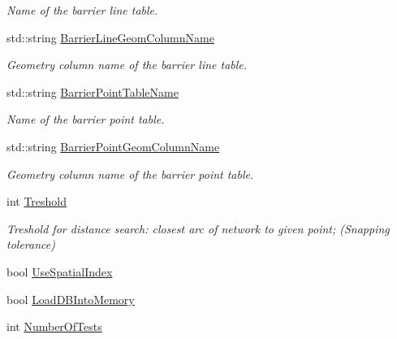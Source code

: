 \begin{DoxyCompactItemize}
\begin{DoxyCompactList}\small\item\em Name of the barrier line table. \end{DoxyCompactList}\item 
std\+::string \hyperlink{structnetxpert_1_1cnfg_1_1Config_a53c92c5975dbb9b861f87838021c360e}{Barrier\+Line\+Geom\+Column\+Name}\hypertarget{structnetxpert_1_1cnfg_1_1Config_a53c92c5975dbb9b861f87838021c360e}{}\label{structnetxpert_1_1cnfg_1_1Config_a53c92c5975dbb9b861f87838021c360e}

\begin{DoxyCompactList}\small\item\em Geometry column name of the barrier line table. \end{DoxyCompactList}\item 
std\+::string \hyperlink{structnetxpert_1_1cnfg_1_1Config_a344e11f497239a95bb1cf7f94542dcbc}{Barrier\+Point\+Table\+Name}\hypertarget{structnetxpert_1_1cnfg_1_1Config_a344e11f497239a95bb1cf7f94542dcbc}{}\label{structnetxpert_1_1cnfg_1_1Config_a344e11f497239a95bb1cf7f94542dcbc}

\begin{DoxyCompactList}\small\item\em Name of the barrier point table. \end{DoxyCompactList}\item 
std\+::string \hyperlink{structnetxpert_1_1cnfg_1_1Config_ad4ab91f16c00fba3b04c76ba770e80e1}{Barrier\+Point\+Geom\+Column\+Name}\hypertarget{structnetxpert_1_1cnfg_1_1Config_ad4ab91f16c00fba3b04c76ba770e80e1}{}\label{structnetxpert_1_1cnfg_1_1Config_ad4ab91f16c00fba3b04c76ba770e80e1}

\begin{DoxyCompactList}\small\item\em Geometry column name of the barrier point table. \end{DoxyCompactList}\item 
int \hyperlink{structnetxpert_1_1cnfg_1_1Config_aee1dee4ec74c14f60bbb87c3c267255f}{Treshold}\hypertarget{structnetxpert_1_1cnfg_1_1Config_aee1dee4ec74c14f60bbb87c3c267255f}{}\label{structnetxpert_1_1cnfg_1_1Config_aee1dee4ec74c14f60bbb87c3c267255f}

\begin{DoxyCompactList}\small\item\em Treshold for distance search\+: closest arc of network to given point; (Snapping tolerance) \end{DoxyCompactList}\item 
bool \hyperlink{structnetxpert_1_1cnfg_1_1Config_a415b76b1b41d24dc3b4cf11b9021f366}{Use\+Spatial\+Index}
\item 
bool \hyperlink{structnetxpert_1_1cnfg_1_1Config_ac94abe7cd836323220db9e8f7ac674df}{Load\+D\+B\+Into\+Memory}
\item 
int \hyperlink{structnetxpert_1_1cnfg_1_1Config_a56651fcf68e1afe6d0a9b042301508ed}{Number\+Of\+Tests}\hypertarget{structnetxpert_1_1cnfg_1_1Config_a56651fcf68e1afe6d0a9b042301508ed}{}\label{structnetxpert_1_1cnfg_1_1Config_a56651fcf68e1afe6d0a9b042301508ed}


\end{DoxyCompactItemize}
